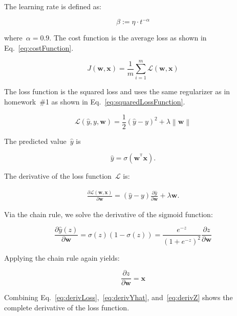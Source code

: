 \documentclass{report}
\newcommand{\yhat}{\hat{y}}
\newcommand{\norm}[1]{\left\lVert#1\right\rVert}
\newcommand{\T}{^\textrm{T}}
\begin{document}
  \noindent
  The learning rate is defined as:
  
  \[\beta := \eta \cdot t^{-\alpha} \]
  
  \noindent
  where~$\alpha=0.9$.  The cost function is the average loss as shown in Eq.~\eqref{eq:costFunction}.
 
  \begin{equation}
    J(\mathbf{w}, \mathbf{x}) = \frac{1}{m}\sum_{i=1}^{m} \mathcal{L}(\mathbf{w},\mathbf{x})
    \label{eq:costFunction}
  \end{equation}
  
  \noindent
  The loss function is the squared loss and uses the same regularizer as in homework~\#1 as shown in Eq.~\eqref{eq:squaredLossFunction}.
  
  \begin{equation}
    \mathcal{L}(\yhat,y,\mathbf{w}) = \frac{1}{2}(\yhat - y)^2 + \lambda  \norm{\mathbf{w}}
    \label{eq:squaredLossFunction}
  \end{equation}
  
  \noindent
  The predicted value~$\yhat$ is 
  
  \[\yhat = \sigma   (\mathbf{w}^{\T}\mathbf{x}) \textrm{.} \]

  The derivative of the loss function~$\mathcal{L}$ is:
  
  \begin{align}
    \frac{\partial \mathcal{L}(\mathbf{w}, \mathbf{x})}{\partial \mathbf{w}} = (\yhat - y)  \frac{\partial \yhat}{\partial \mathbf{w}} + \lambda \mathbf{w} \textrm{.}
    \label{eq:derivLoss}
  \end{align}

  \noindent
  Via the chain rule, we solve the derivative of the sigmoid function:
  
  \begin{equation}
    \frac{\partial \yhat(z)}{\partial \mathbf{w}} = \sigma(z) (1-\sigma(z)) = \frac{e^{-z}}{(1+e^{-z})^{2}}  \frac{\partial z}{\partial \mathbf{w}}
    \label{eq:derivYhat}
  \end{equation}

  \noindent
  Applying the chain rule again yields:
  
  \begin{equation}
    \frac{\partial z}{\partial \mathbf{w}} = \mathbf{x}
    \label{eq:derivZ}
  \end{equation}

  \noindent
  Combining Eq.~\eqref{eq:derivLoss},~\eqref{eq:derivYhat}, and~\eqref{eq:derivZ} shows the complete derivative of the loss function.
  
\end{document}
